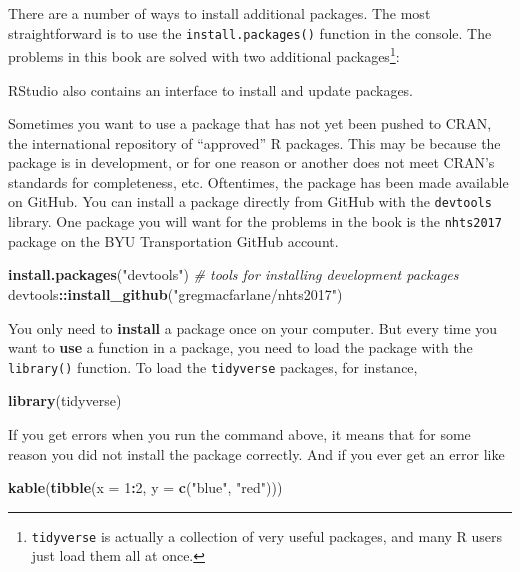 \documentclass[]{book}
\newenvironment{Shaded}{\begin{snugshade}}{\end{snugshade}}
\newcommand{\CommentTok}[1]{\textcolor[rgb]{0.56,0.35,0.01}{\textit{#1}}}
\newcommand{\DataTypeTok}[1]{\textcolor[rgb]{0.13,0.29,0.53}{#1}}
\newcommand{\DecValTok}[1]{\textcolor[rgb]{0.00,0.00,0.81}{#1}}
\newcommand{\KeywordTok}[1]{\textcolor[rgb]{0.13,0.29,0.53}{\textbf{#1}}}
\newcommand{\NormalTok}[1]{#1}
\newcommand{\OperatorTok}[1]{\textcolor[rgb]{0.81,0.36,0.00}{\textbf{#1}}}
\newcommand{\StringTok}[1]{\textcolor[rgb]{0.31,0.60,0.02}{#1}}
\let\rmarkdownfootnote\footnote%
\def\footnote{\protect\rmarkdownfootnote}
\begin{document}
There are a number of ways to install additional packages. The most straightforward
is to use the \texttt{install.packages()} function in the console. The problems
in this book are solved with two additional packages\footnote{\texttt{tidyverse} is actually a collection
  of very useful packages, and many R users just load them all at once.}:

RStudio also contains an interface to install and update packages.

Sometimes you want to use a package that has not yet been pushed to CRAN, the
international repository of ``approved'' R packages. This may be because the package
is in development, or for one reason or another does not meet CRAN's standards
for completeness, etc. Oftentimes, the package has been made available on GitHub.
You can install a package directly from GitHub with the \texttt{devtools} library. One
package you will want for the problems in the book is the \texttt{nhts2017} package
on the BYU Transportation GitHub account.

\begin{Shaded}
\begin{Highlighting}[]
\KeywordTok{install.packages}\NormalTok{(}\StringTok{"devtools"}\NormalTok{) }\CommentTok{# tools for installing development packages}
\NormalTok{devtools}\OperatorTok{::}\KeywordTok{install_github}\NormalTok{(}\StringTok{"gregmacfarlane/nhts2017"}\NormalTok{)}
\end{Highlighting}
\end{Shaded}

You only need to \textbf{install} a package once on your computer. But every time you
want to \textbf{use} a function in a package, you need to load the package with the
\texttt{library()} function. To load the \texttt{tidyverse} packages, for instance,

\begin{Shaded}
\begin{Highlighting}[]
\KeywordTok{library}\NormalTok{(tidyverse)}
\end{Highlighting}
\end{Shaded}

If you get errors when you run the command above, it means that for some reason
you did not install the package correctly. And if you ever get an error like

\begin{Shaded}
\begin{Highlighting}[]
\KeywordTok{kable}\NormalTok{(}\KeywordTok{tibble}\NormalTok{(}\DataTypeTok{x =} \DecValTok{1}\OperatorTok{:}\DecValTok{2}\NormalTok{, }\DataTypeTok{y =} \KeywordTok{c}\NormalTok{(}\StringTok{"blue"}\NormalTok{, }\StringTok{"red"}\NormalTok{)))}
\end{Highlighting}
\end{Shaded}
\end{document}
